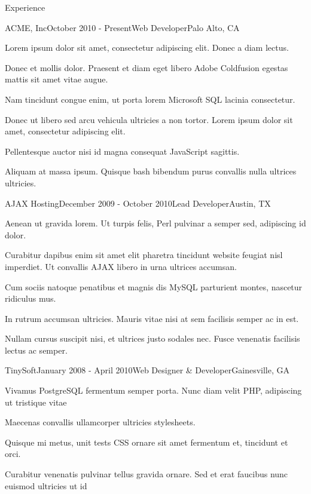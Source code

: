 \documentclass[
	11pt, %
]{resume} %
\begin{document}
\begin{rSection}{Experience}

	\begin{rSubsection}{ACME, Inc}{October 2010 - Present}{Web Developer}{Palo Alto, CA}
		\item Lorem ipsum dolor sit amet, consectetur adipiscing elit. Donec a diam lectus.
		\item Donec et mollis dolor. Praesent et diam eget libero Adobe Coldfusion egestas mattis sit amet vitae augue.
		\item Nam tincidunt congue enim, ut porta lorem Microsoft SQL lacinia consectetur.
		\item Donec ut libero sed arcu vehicula ultricies a non tortor. Lorem ipsum dolor sit amet, consectetur adipiscing elit.
		\item Pellentesque auctor nisi id magna consequat JavaScript sagittis.
		\item Aliquam at massa ipsum. Quisque bash bibendum purus convallis nulla ultrices ultricies.
	\end{rSubsection}


	\begin{rSubsection}{AJAX Hosting}{December 2009 - October 2010}{Lead Developer}{Austin, TX}
		\item Aenean ut gravida lorem. Ut turpis felis, Perl pulvinar a semper sed, adipiscing id dolor.
		\item Curabitur dapibus enim sit amet elit pharetra tincidunt website feugiat nisl imperdiet. Ut convallis AJAX libero in urna ultrices accumsan.
		\item Cum sociis natoque penatibus et magnis dis MySQL parturient montes, nascetur ridiculus mus.
		\item In rutrum accumsan ultricies. Mauris vitae nisi at sem facilisis semper ac in est.
		\item Nullam cursus suscipit nisi, et ultrices justo sodales nec. Fusce venenatis facilisis lectus ac semper.
	\end{rSubsection}


	\begin{rSubsection}{TinySoft}{January 2008 - April 2010}{Web Designer \& Developer}{Gainesville, GA}
		\item Vivamus PostgreSQL fermentum semper porta. Nunc diam velit PHP, adipiscing ut tristique vitae
		\item Maecenas convallis ullamcorper ultricies stylesheets.
		\item Quisque mi metus, unit tests CSS ornare sit amet fermentum et, tincidunt et orci.
		\item Curabitur venenatis pulvinar tellus gravida ornare. Sed et erat faucibus nunc euismod ultricies ut id
	\end{rSubsection}

\end{rSection}
\end{document}
